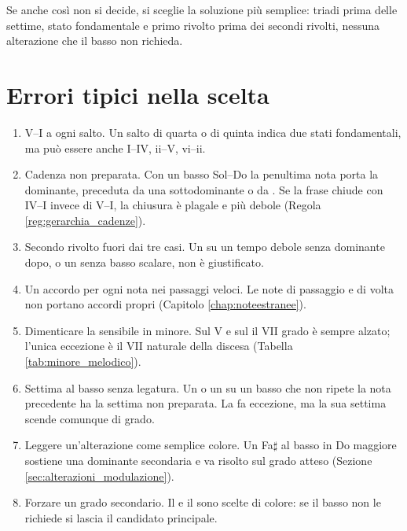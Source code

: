 Se anche così non si decide, si sceglie la soluzione più semplice: triadi prima delle settime, stato fondamentale e primo rivolto prima dei secondi rivolti, nessuna alterazione che il basso non richieda.

\section{Errori tipici nella scelta}
\label{sec:errori_scelta}

\begin{errore}
	\label{err:scelta_numerica}
	\begin{enumerate}
		\item V--I a ogni salto. Un salto di quarta o di quinta indica due stati fondamentali, ma può essere anche I--IV, ii--V, vi--ii.
		\item Cadenza non preparata. Con un basso Sol--Do la penultima nota porta la dominante, preceduta da una sottodominante o da . Se la frase chiude con IV--I invece di V--I, la chiusura è plagale e più debole (Regola \ref{reg:gerarchia_cadenze}).
		\item Secondo rivolto fuori dai tre casi. Un  su un tempo debole senza dominante dopo, o un  senza basso scalare, non è giustificato.
		\item Un accordo per ogni nota nei passaggi veloci. Le note di passaggio e di volta non portano accordi propri (Capitolo \ref{chap:noteestranee}).
		\item Dimenticare la sensibile in minore. Sul V e sul  il VII grado è sempre alzato; l'unica eccezione è il VII naturale della discesa (Tabella \ref{tab:minore_melodico}).
		\item Settima al basso senza legatura. Un  o un  su un basso che non ripete la nota precedente ha la settima non preparata. La  fa eccezione, ma la sua settima scende comunque di grado.
		\item Leggere un'alterazione come semplice colore. Un Fa$\sharp$ al basso in Do maggiore sostiene una dominante secondaria e va risolto sul grado atteso (Sezione \ref{sec:alterazioni_modulazione}).
		\item Forzare un grado secondario. Il  e il  sono scelte di colore: se il basso non le richiede si lascia il candidato principale.
	\end{enumerate}
\end{errore}
